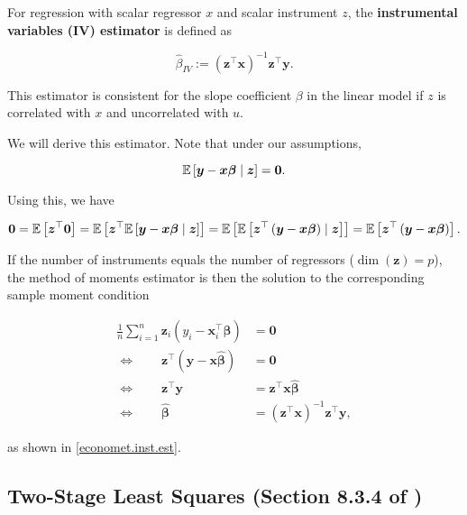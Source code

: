 For regression with scalar regressor \(x\) and scalar instrument \(z\), the \textbf{instrumental variables (IV) estimator} is defined as

\[
\hat{\beta}_{IV} :=  \left( \boldsymbol{z}^\top \boldsymbol{x} \right)^{-1} \boldsymbol{z}^\top \boldsymbol{y}.
\]

This estimator is consistent for the slope coefficient \(\beta\) in the linear model if \(z\) is correlated with \(x\) and uncorrelated with \(u\).

We will derive this estimator. Note that under our assumptions,

\[
\E \left[  \boldsymbol{y} - \boldsymbol{x} \boldsymbol{\beta} \mid \boldsymbol{z} \right] = \boldsymbol{0}.
\]

Using this, we have

\[
\boldsymbol{0} = \E \left[ \boldsymbol{z}^\top \boldsymbol{0} \right] = \E \left[ \boldsymbol{z}^\top \E \left[  \boldsymbol{y} - \boldsymbol{x} \boldsymbol{\beta} \mid \boldsymbol{z} \right] \right] = \E \left[ \E \left[ \boldsymbol{z}^\top  \left( \boldsymbol{y} - \boldsymbol{x} \boldsymbol{\beta} \right)  \mid \boldsymbol{z} \right] \right] = \E \left[ \boldsymbol{z}^\top  \left( \boldsymbol{y} - \boldsymbol{x} \boldsymbol{\beta} \right)   \right].
\]

If the number of instruments equals the number of regressors (\(\operatorname{dim}(\boldsymbol{z}) = p\)), the method of moments estimator is then the solution to the corresponding sample moment condition

\begin{align*}
\frac{1}{n} \sum_{i=1}^n \boldsymbol{z}_i(y_i - \boldsymbol{x}_i^\top \hat{\boldsymbol{\beta}}) & = \boldsymbol{0}
\\ \iff \qquad  \boldsymbol{z}^\top  \left( \boldsymbol{y} - \boldsymbol{x} \hat{\boldsymbol{\beta}} \right) & = \boldsymbol{0}
\\ \iff \qquad  \boldsymbol{z}^\top \boldsymbol{y}  & =   \boldsymbol{z}^\top \boldsymbol{x} \hat{\boldsymbol{\beta}}
\\ \iff \qquad \hat{\boldsymbol{\beta}} & = \left(\boldsymbol{z}^\top \boldsymbol{x}  \right)^{-1}  \boldsymbol{z}^\top \boldsymbol{y} ,
\end{align*}

as shown in \eqref{economet.inst.est}.



\subsection{Two-Stage Least Squares (Section 8.3.4 of \citet{Greene2003Econometric})}

